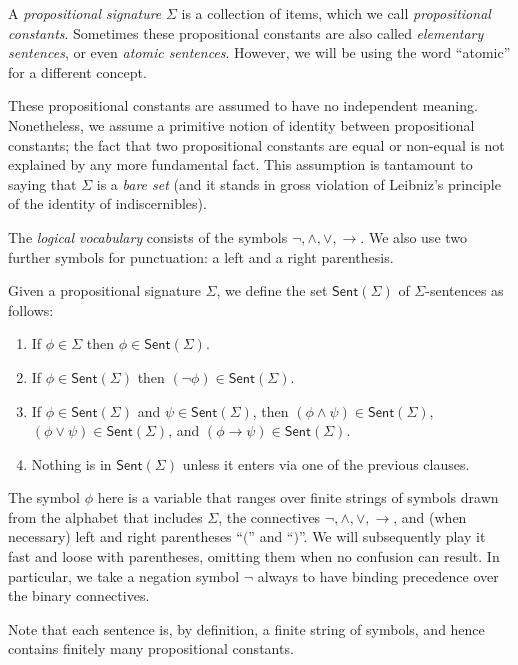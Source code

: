 \begin{defn} A \emph{propositional signature} $\Sigma$ is a collection
  of items, which we call \emph{propositional constants}.  Sometimes
  these propositional constants are also called \emph{elementary
    sentences}, or even \emph{atomic sentences}.  However, we will be
  using the word ``atomic'' for a different concept.

  These propositional constants are assumed to have no independent
  meaning.  Nonetheless, we assume a primitive notion of identity
  between propositional constants; the fact that two propositional
  constants are equal or non-equal is not explained by any more
  fundamental fact.  This assumption is tantamount to saying that
  $\Sigma$ is a \emph{bare set} (and it stands in gross violation of
  Leibniz's principle of the identity of indiscernibles).  \end{defn}

\begin{ass} The \emph{logical vocabulary} consists of the symbols
  $\neg ,\wedge ,\vee ,\to$.  We also use two further symbols for
  punctuation: a left and a right parenthesis.
\end{ass}

\newcommand{\sigsn}{\mathsf{Sent}(\Sigma )}

\begin{defn} Given a propositional signature $\Sigma$, we define the
  set $\sigsn$ of $\Sigma$-sentences as follows:
\begin{enumerate}
\item If $\phi\in\Sigma$ then $\phi\in\sigsn$.
\item If $\phi\in\sigsn$ then $(\neg\phi )\in\sigsn$.
\item If $\phi\in\sigsn$ and $\psi\in\sigsn$, then $(\phi\wedge\psi )
  \in\sigsn$, $(\phi\vee\psi )\in\sigsn$, and $(\phi\to\psi
  )\in\sigsn$.
\item Nothing is in $\sigsn$ unless it enters via one of the previous
  clauses.
\end{enumerate}
The symbol $\phi$ here is a variable that ranges over finite strings
of symbols drawn from the alphabet that includes $\Sigma$, the
connectives $\neg ,\wedge ,\vee, \to$, and (when necessary) left and
right parentheses ``$($'' and ``$)$''.  We will subsequently play it
fast and loose with parentheses, omitting them when no confusion can
result.  In particular, we take a negation symbol $\neg$ always to
have binding precedence over the binary connectives.

Note that each sentence is, by definition, a finite string of symbols,
and hence contains finitely many propositional constants.
\end{defn}

